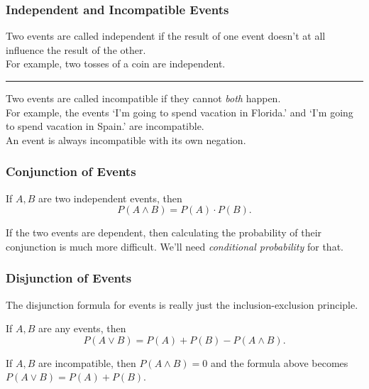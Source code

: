 \documentclass[aspectratio=169,11pt,usenames,dvipsnames]{beamer}
\begin{document}
\begin{frame}
 \frametitle{Independent and Incompatible Events}
 Two events are called \alert{independent} if the result of one event doesn't at
 all influence the result of the other.\pause\\
 For example, two tosses of a coin are independent.\pause\\
 \vspace{2\parskip}
 \hrule
 Two events are called \alert{incompatible} if they cannot \emph{both}
 happen.\pause\\
 For example, the events `I'm going to spend vacation in Florida.' and `I'm
 going to spend vacation in Spain.' are incompatible.\pause\\
 An event is always incompatible with its own negation.
\end{frame}

\begin{frame}
 \frametitle{Conjunction of Events}
 \begin{tcolorbox}[title=Conjunction Formula]
  If $A,B$ are two \alert{independent} events, then
  \[
   P(A \wedge B) = P(A) \cdot P(B).
  \]
 \end{tcolorbox}
 \pause
 If the two events are \alert{dependent}, then calculating the probability of
 their conjunction is much more difficult. We'll need \emph{conditional
 probability} for that.
\end{frame}

\begin{frame}
 \frametitle{Disjunction of Events}
 The disjunction formula for events is really just the inclusion-exclusion
 principle.\pause\\
 \begin{tcolorbox}[title=Disjunction Formula]
  If $A,B$ are any events, then
  \[
   P(A \vee B) = P(A) + P(B) - P(A \wedge B).
  \]
 \end{tcolorbox}
 \pause
 If $A,B$ are \alert{incompatible}, then $P(A \wedge B) = 0$ and the formula
 above becomes $P(A \vee B) = P(A) + P(B)$.
\end{frame}
\end{document}
